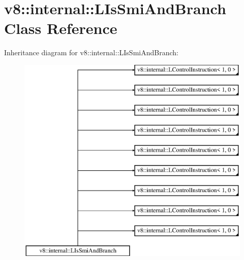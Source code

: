 \hypertarget{classv8_1_1internal_1_1_l_is_smi_and_branch}{}\section{v8\+:\+:internal\+:\+:L\+Is\+Smi\+And\+Branch Class Reference}
\label{classv8_1_1internal_1_1_l_is_smi_and_branch}
Inheritance diagram for v8\+:\+:internal\+:\+:L\+Is\+Smi\+And\+Branch\+:\begin{figure}[H]
\begin{center}
\leavevmode
\includegraphics[height=10.000000cm]{classv8_1_1internal_1_1_l_is_smi_and_branch}
\end{center}
\end{figure}
